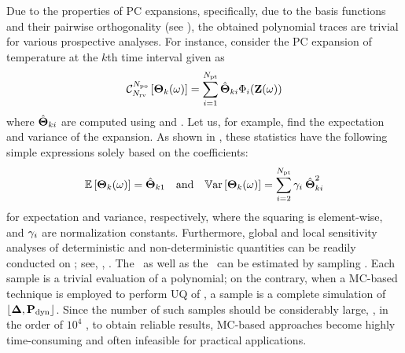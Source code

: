 Due to the properties of PC expansions, specifically, due to the basis functions and their pairwise orthogonality (see ), the obtained polynomial traces are trivial for various prospective analyses. For instance, consider the PC expansion of temperature at the $k$th time interval given as
\begin{equation} \elabel{pc-k}
  \oPC{\vars}{\pcorder}{\vTO_k(\o)} = \sum_{i = 1}^{\pcterms} \pcc{\vTO}_{ki} \pcb_i(\vZ(\o))
\end{equation}
where $\hat{{\boldsymbol\Theta}}_{ki}$ are computed using  and . Let us, for example, find the expectation and variance of the expansion. As shown in , these statistics have the following simple expressions solely based on the coefficients:
\begin{equation} \elabel{pc-moments}
  \oExp{\vTO_k(\o)} = \pcc{\vTO}_{k1} \hspace{1em} \text{and} \hspace{1em} \oVar{\vTO_k(\o)} = \sum_{i = 2}^{\pcterms} \pcn_i \: \pcc{\vTO}_{ki}^2
\end{equation}
for expectation and variance, respectively, where the squaring is element-wise, and $\gamma_i$ are normalization constants. Furthermore, global and local sensitivity analyses of deterministic and non-deterministic quantities can be readily conducted on ; see, \eg, \cite{eldred2009, maitre2010}. The \cdf\ as well as the \pdf\ can be estimated by sampling . Each sample is a trivial evaluation of a polynomial; on the contrary, when a MC-based technique is employed to perform UQ of , a sample is a complete simulation of $\profPdyn$. Since the number of such samples should be considerably large, \eg, in the order of $10^4$ \cite{xiu2010, diaz-emparanza2002}, to obtain reliable results, MC-based approaches become highly time-consuming and often infeasible for practical applications.
